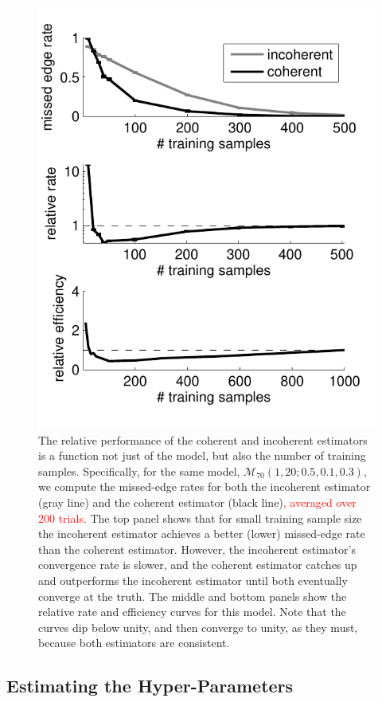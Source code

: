 \documentclass[10pt,journal,cspaper,compsoc]{IEEEtran}
\providecommand{\tr}[1]{\textcolor{red}{#1}}
\providecommand{\mc}[1]{\mathcal{#1}}
\begin{document}
\begin{figure}[htbp]
	\centering
		\includegraphics[width=0.8\linewidth]{../figs/RE_V70_s20_p10_q30.pdf}
	\caption{The relative performance of the coherent and incoherent estimators is a function not just of the model, but also the number of training samples.  Specifically, for the same model, $\mc{M}_{70}(1,20;0.5,0.1,0.3)$, we compute the missed-edge rates for both the incoherent estimator (gray line) and the coherent estimator (black line)\tr{, averaged over 200 trials}.  The top panel shows that for small training sample size the incoherent estimator achieves a better (lower) missed-edge rate than the coherent estimator. However, the incoherent estimator's convergence rate is slower, and the coherent estimator catches up and outperforms the incoherent estimator until both eventually converge at the truth.  The middle and bottom panels show the relative rate and efficiency curves for this model. Note that the curves dip below unity, and then converge to unity, as they must, because both estimators are consistent. }
	\label{fig:RE}
\end{figure}


\subsection{Estimating the Hyper-Parameters} %
\label{sub:estimating_the_hyper_parameters}
\end{document}
